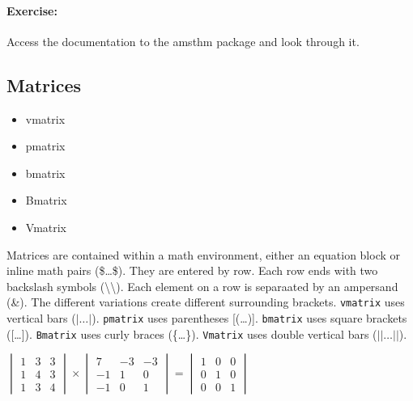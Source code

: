         \paragraph{Exercise:} Access the documentation to the amsthm package and look through it.


        \subsection{Matrices}
        \label{Matrices}
        
        \begin{cmd}
            \begin{itemize}
                \item{vmatrix}
                \item{pmatrix}
                \item{bmatrix}
                \item{Bmatrix}
                \item{Vmatrix}
            \end{itemize}
        \end{cmd}

        Matrices are contained within a math environment, either an equation block or inline math pairs (\$\ldots\$). They are entered by row. Each row ends with two backslash symbols (\textbackslash\textbackslash). Each element on a row is separaated by an ampersand (\&). The different variations create different surrounding brackets.
        \texttt{vmatrix} uses vertical bars ($|\ldots|$).
        \texttt{pmatrix} uses parentheses [(\ldots)].
        \texttt{bmatrix} uses square brackets ([\ldots]).
        \texttt{Bmatrix} uses curly braces (\{\ldots\}).
        \texttt{Vmatrix} uses double vertical bars ($||\ldots||$).
        
        \begin{sample}
        $ \begin{vmatrix}
            1 & 3 & 3 \\
            1 & 4 & 3 \\
            1 & 3 & 4 
        \end{vmatrix}
         \times 
         \begin{vmatrix}
             7 & -3 & -3 \\
             -1 & 1 & 0 \\
             -1 & 0 & 1
         \end{vmatrix}
         =
         \begin{vmatrix}
             1 & 0 & 0 \\
             0 & 1 & 0 \\
             0 & 0 & 1
         \end{vmatrix} $
        \end{sample}

